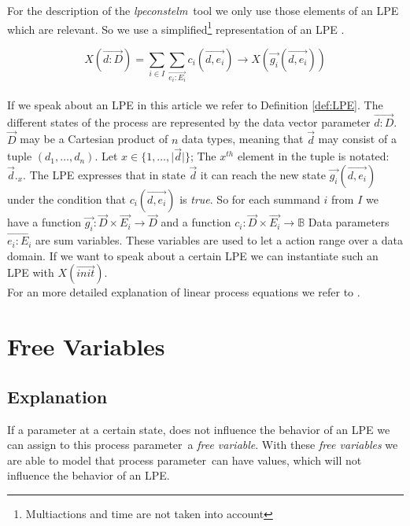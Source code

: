 \index{}\documentclass[a4paper,10pt]{article}
\theoremstyle{plain}
\theoremstyle{definition}
\newcommand{\lpe}{linear process equation}
\newcommand{\tool}{\textit{lpeconstelm}}
\newcommand{\ovr}{\overrightarrow}
\newcommand{\mcrl}{mCRL2}
\newcommand{\pp}{process parameter}
\newcommand{\ti}{\textit}
\begin{document}
\noindent For the description of the \tool\ tool we only use those elements of an LPE which are relevant. So we use a simplified\footnote{Multiactions and time are not taken into account} representation of an LPE .
\begin{defn}\label{def:LPE}
\begin{displaymath}
X (\ovr{d:D}) = \sum_{i \in I} \sum_{\ovr{e_i:E_i}} c_i ( \ovr{d, e_i}) \rightarrow X(\ovr{g_i}(\ovr{d,e_i}))
\end{displaymath}\\
If we speak about an LPE in this article we refer to Definition \ref{def:LPE}.  The different states 
of the process are represented by the data vector parameter $\ovr{d: D}$. $\ovr{D}$ may be a Cartesian product of $n$ data types, meaning that $\ovr{d}$ may consist of a tuple $(d_1, \ldots, d_n)$. 
Let $x \in \lbrace 1, \ldots , \vert \ovr{d} \vert \rbrace$; The $x^{th}$ element in the tuple is notated: $\ovr{d}._x$.
The LPE expresses that in state $\ovr{d}$ %
it can reach the new state $\ovr{g_i}(\ovr{d,e_i})$ under the condition that $c_i(\ovr{d,e_i})$ is \ti{true}. So for each summand $i$ from $I$ we have a function $\ovr{g_i}: \ovr{D} \times \ovr{E_i} \rightarrow \ovr{D}$ and a function $c_i: \ovr{D} \times \ovr{E_i} \rightarrow \mathbb{B}$
Data parameters $\ovr{e_i : E_i}$ are sum variables. These variables are used to let a action range over a data domain. 
If we want to speak about a certain LPE we can instantiate such an LPE with $X(\ovr{init})$. \\

\noindent For an more detailed explanation of \lpe s  we refer to \cite{LPE_info}.
\end{defn}

\section{Free Variables}
\subsection{Explanation}

If a parameter at a certain state, does not influence the behavior of an LPE we can assign to this \pp\ a \ti{free variable}. With these \ti{free variables} we are able to model that \pp\ can have values, which will not influence the behavior of an LPE. %
\end{document}
